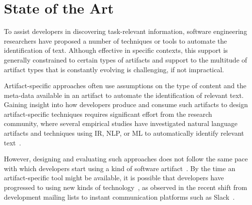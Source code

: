 \section{State of the Art}
\label{cp1:novelty}



To assist developers in discovering task-relevant information,
software engineering researchers have proposed 
a number of techniques or tools 
to automate the identification of  text.
Although effective in specific contexts, this support is generally constrained 
to certain
types of artifacts and support to the multitude of artifact types that is constantly evolving
is challenging, if not impractical.



Artifact-specific approaches often use assumptions on the type of content 
and the meta-data available in an artifact
to automate the identification of relevant text.
Gaining insight into how developers produce and consume 
such artifacts to design artifact-specific techniques
 requires significant effort from the research community,
 where several empirical studies have investigated 
natural language artifacts 
and techniques using \acf{IR}, \acf{NLP}, or \acf{ML}  to automatically identify
relevant text~\cite{panichella2012, Ko2006, Arya2019, Maalej2013}.


However, designing and evaluating such approaches
does not follow the same pace with which developers start using
a kind of software artifact~\cite{garousi2019}.
By the time an artifact-specific tool might be available,
it is possible 
that developers have progressed to using new kinds of technology~\cite{gibbs1994},
as observed in the recent shift from 
development mailing lists to instant communication platforms such as Slack~\cite{Lin2016}. 









